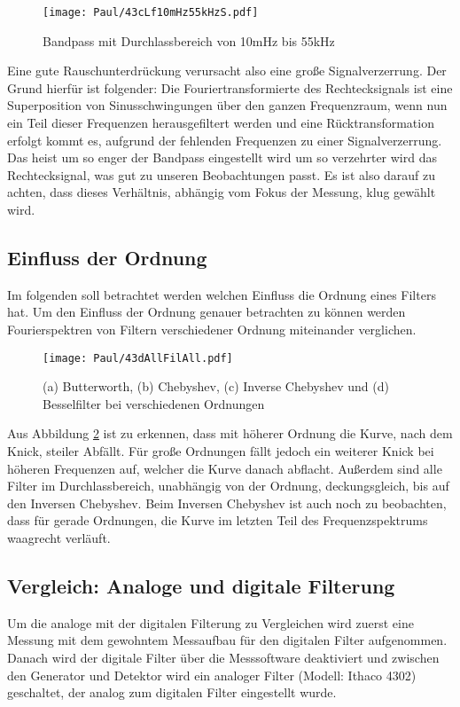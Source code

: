 \begin{figure}[h]
    \centering
    \texttt{[image: Paul/43cLf10mHz55kHzS.pdf]}
    \caption{Bandpass mit Durchlassbereich von 10mHz bis 55kHz}
    \label{fig:43cBeBa}
\end{figure}

Eine gute Rauschunterdrückung verursacht also eine große Signalverzerrung. Der Grund hierfür ist folgender: Die Fouriertransformierte des Rechtecksignals ist eine Superposition von Sinusschwingungen über den ganzen Frequenzraum, wenn nun ein Teil dieser Frequenzen herausgefiltert werden und eine Rücktransformation erfolgt kommt es, aufgrund der fehlenden Frequenzen zu einer Signalverzerrung. Das heist um so enger der Bandpass eingestellt wird um so verzehrter wird das Rechtecksignal, was gut zu unseren Beobachtungen passt. Es ist also darauf zu achten, dass dieses Verhältnis, abhängig vom Fokus der Messung, klug gewählt wird.

\newpage
\subsection{Einfluss der Ordnung}
\label{chap:Einfl-d-Ord}
Im folgenden soll betrachtet werden welchen Einfluss die Ordnung eines Filters hat.
Um den Einfluss der Ordnung genauer betrachten zu können werden Fourierspektren von Filtern verschiedener Ordnung miteinander verglichen.

\begin{figure}[h]
    \centering
    \texttt{[image: Paul/43dAllFilAll.pdf]}
    \caption{(a) Butterworth, (b) Chebyshev, (c) Inverse Chebyshev und (d) Besselfilter bei verschiedenen Ordnungen}
    \label{fig:43dOrd}
\end{figure}

Aus Abbildung \ref{fig:43dOrd} ist zu erkennen, dass mit höherer Ordnung die Kurve, nach dem Knick, steiler Abfällt.
Für große Ordnungen fällt jedoch ein weiterer Knick bei höheren Frequenzen auf, welcher die Kurve danach abflacht. Außerdem sind alle Filter im Durchlassbereich, unabhängig von der Ordnung, deckungsgleich, bis auf den Inversen Chebyshev. Beim Inversen Chebyshev ist auch noch zu beobachten, dass für gerade Ordnungen, die Kurve im letzten Teil des Frequenzspektrums waagrecht verläuft.

\newpage
\subsection{Vergleich: Analoge und digitale Filterung}
Um die analoge mit der digitalen Filterung zu Vergleichen wird zuerst eine Messung mit dem gewohntem Messaufbau für den digitalen Filter aufgenommen. Danach wird der digitale Filter über die Messsoftware deaktiviert und zwischen den Generator und Detektor wird ein analoger Filter (Modell: Ithaco 4302) geschaltet, der analog zum digitalen Filter eingestellt wurde.

